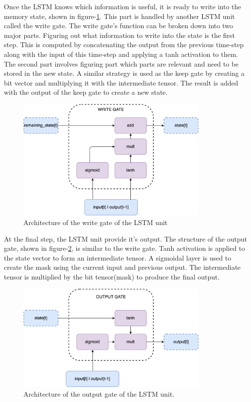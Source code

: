 Once the LSTM knows which information is useful, it is ready to write into the memory state, shown in figure-\ref{fig:write-gate}. This part is handled by another LSTM unit called the write gate. The write gate's function can be broken down into two major parts. Figuring out what information to write into the state is the first step. This is computed by concatenating the output from the previous time-step along with the input of this time-step and applying a tanh activation to them. The second part involves figuring part which parts are relevant and need to be stored in the new state. A similar strategy is used as the keep gate by creating a bit vector and multiplying it with the intermediate tensor. The result is added with the output of the keep gate to create a new state. 
\begin{figure}[!h]
	\centering
	\includegraphics[width=0.85\textwidth]{Pictures/write-gate.png}
	\hspace{1mm}
	\caption{Architecture of the write gate of the LSTM unit } 
	\label{fig:write-gate}
\end{figure}

At the final step, the LSTM unit provide it's output. The structure of the output gate, shown in figure-\ref{fig:output-gate}, is similar to the write gate. Tanh activation is applied to the state vector to form an intermediate tensor. A sigmoidal layer is used to create the mask using the current input and previous output. The intermediate tensor is multiplied by the bit tensor(mask) to produce the final output.
\begin{figure}[!h]
	\centering
	\includegraphics[width=0.85\textwidth]{Pictures/output-gate.png}
	\hspace{1mm}
	\caption{Architecture of the output gate of the LSTM unit.} 
	\label{fig:output-gate}
\end{figure}

